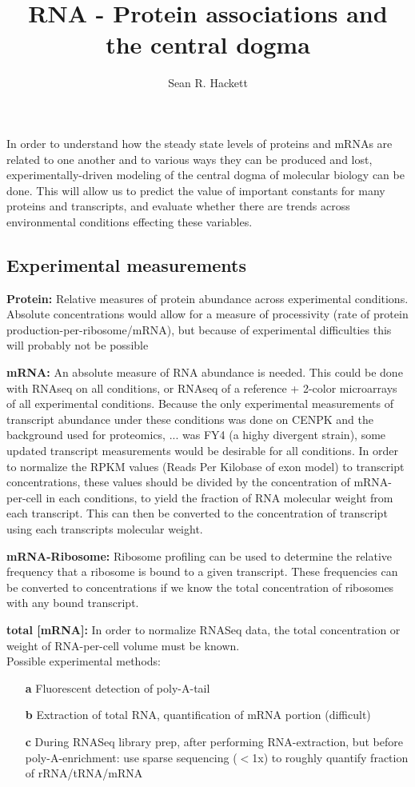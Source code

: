 \documentclass[12pt]{article}
\author{Sean R. Hackett}
\title{RNA - Protein associations and the central dogma}
\date{}
\begin{document}
\setlength{\parskip}{1mm}
\linespread{1}

\thispagestyle{empty}
\pagestyle{empty}

\maketitle

In order to understand how the steady state levels of proteins and mRNAs are related to one another and to various ways they can be produced and lost, experimentally-driven modeling of the central dogma of molecular biology can be done.  This will allow us to predict the value of important constants for many proteins and transcripts, and evaluate whether there are trends across environmental conditions effecting these variables.

\subsection*{Experimental measurements}

\textbf{Protein:} Relative measures of protein abundance across experimental conditions.  Absolute concentrations would allow for a measure of processivity (rate of protein production-per-ribosome/mRNA), but because of experimental difficulties this will probably not be possible

\textbf{mRNA:} An absolute measure of RNA abundance is needed.  This could be done with RNAseq on all conditions, or RNAseq of a reference + 2-color microarrays of all experimental conditions.  Because the only experimental measurements of transcript abundance under these conditions was done on CENPK and the background used for proteomics, ... was FY4 (a highy divergent strain), some updated transcript measurements would be desirable for all conditions.  In order to normalize the RPKM values (Reads Per Kilobase of exon model) to transcript concentrations, these values should be divided by the concentration of mRNA-per-cell in each conditions, to yield the fraction of RNA molecular weight from each transcript.  This can then be converted to the concentration of transcript using each transcripts molecular weight.

\textbf{mRNA-Ribosome:} Ribosome profiling can be used to determine the relative frequency that a ribosome is bound to a given transcript.  These frequencies can be converted to concentrations if we know the total concentration of ribosomes with any bound transcript.

\textbf{total [mRNA]:} In order to normalize RNASeq data, the total concentration or weight of RNA-per-cell volume must be known.\\
Possible experimental methods:
\begin{itemize}
\item[\textbf{a}] Fluorescent detection of poly-A-tail
\item[\textbf{b}] Extraction of total RNA, quantification of mRNA portion (difficult)
\item[\textbf{c}] During RNASeq library prep, after performing RNA-extraction, but before poly-A-enrichment: use sparse sequencing ($<$1x) to roughly quantify fraction of rRNA/tRNA/mRNA
\end{itemize}
\end{document}

